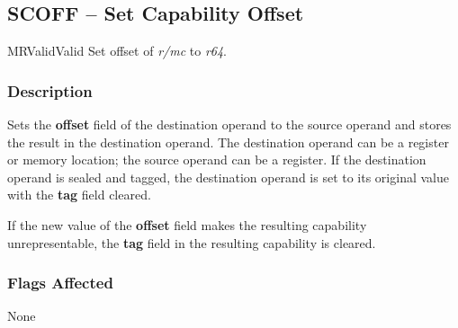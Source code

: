 \clearpage
{}
{}
\subsection*{SCOFF -- Set Capability Offset}

\begin{x86opcodetable}
  {MR}{Valid}{Valid}
  {Set offset of \emph{r/mc} to \emph{r64}.}
\end{x86opcodetable}

\begin{x86opentable}
\end{x86opentable}

\subsubsection*{Description}

Sets the \textbf{offset} field of the destination operand to the
source operand and stores the result in the destination operand.  The
destination operand can be a register or memory location; the source
operand can be a register.  If the destination operand is sealed and
tagged, the destination operand is set to its original value with the
\textbf{tag} field cleared.

If the new value of the \textbf{offset} field makes the resulting
capability unrepresentable, the \textbf{tag} field in the resulting
capability is cleared.

\subsubsection*{Flags Affected}

None
